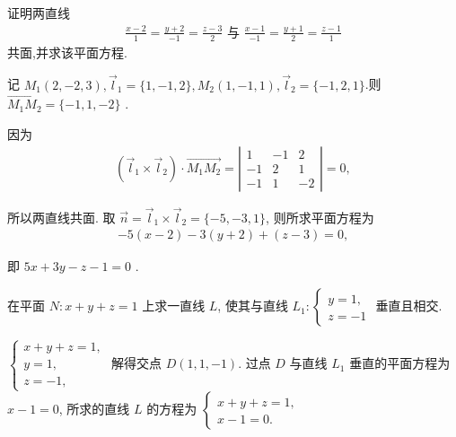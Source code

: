 \begin{exercise}
	证明两直线
	\begin{align*}
		\frac{x-2}{1}=\frac{y+2}{-1}=\frac{z-3}{2} \text { 与 } \frac{x-1}{-1}=\frac{y+1}{2}=\frac{z-1}{1}
	\end{align*}
	共面,并求该平面方程.
\end{exercise}
\begin{solution}
	记 $M_1(2,-2,3), \vec{l}_1=\{1,-1,2\}, M_2(1,-1,1), \vec{l}_2=\{-1,2,1\}$.则 $\overrightarrow{M_1 M_2}=\{-1,1,-2\}$ .

	因为
	\begin{align*}
		\left(\vec{l}_1 \times \vec{l}_2\right) \cdot \overrightarrow{M_1 M_2}=\left|\begin{array}{ccc}
			                                                                             1  & -1 & 2  \\
			                                                                             -1 & 2  & 1  \\
			                                                                             -1 & 1  & -2
		                                                                             \end{array}\right|=0,
	\end{align*}

	所以两直线共面.
	取 $\vec{n}=\vec{l}_1 \times \vec{l}_2=\{-5,-3,1\}$, 则所求平面方程为
	\begin{align*}
		-5(x-2)-3(y+2)+(z-3)=0,
	\end{align*}

	即 $5 x+3 y-z-1=0$ .
\end{solution}

\begin{exercise}
	在平面 $N: x+y+z=1$ 上求一直线 $L$, 使其与直线 $L_1:\left\{\begin{array}{l}y=1, \\ z=-1\end{array}\right.$ 垂直且相交.
\end{exercise}
\begin{solution}
	$\left\{\begin{array}{l}x+y+z=1, \\ y=1, \\ z=-1,\end{array}\right.$ 解得交点 $D(1,1,-1)$.
	过点 $D$ 与直线 $L_1$ 垂直的平面方程为 $x-1=0$, 所求的直线 $L$ 的方程为 $\left\{\begin{array}{l}x+y+z=1, \\ x-1=0 .\end{array}\right.$
\end{solution}

